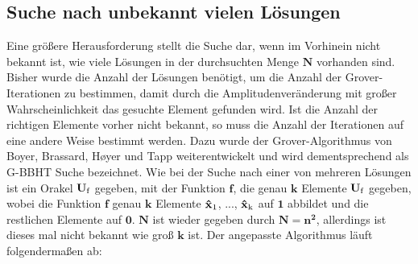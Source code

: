 \subsection{Suche nach unbekannt vielen Lösungen}
Eine größere Herausforderung stellt die Suche dar, wenn im Vorhinein nicht bekannt ist, wie viele Lösungen in der durchsuchten Menge $\mathbf{N}$ vorhanden sind. 
Bisher wurde die Anzahl der Lösungen benötigt, um die Anzahl der Grover-Iterationen zu bestimmen, damit durch die Amplitudenveränderung mit großer Wahrscheinlichkeit das gesuchte Element gefunden wird. 
Ist die Anzahl der richtigen Elemente vorher nicht bekannt, so muss die Anzahl der Iterationen auf eine andere Weise bestimmt werden. 
Dazu wurde der Grover-Algorithmus von Boyer, Brassard, Høyer und Tapp weiterentwickelt und wird dementsprechend als G-BBHT Suche bezeichnet.
Wie bei der Suche nach einer von mehreren Lösungen ist ein Orakel $\mathbf{U \textsubscript{f}}$ gegeben, mit der Funktion $\mathbf{f}$, die genau $\mathbf{k}$ Elemente $\mathbf{U \textsubscript{f}}$ gegeben, wobei die Funktion $\mathbf{f}$ genau $\mathbf{k}$ Elemente $\mathbf{\hat x \textsubscript{1}}$, ..., $\mathbf{\hat x \textsubscript{k}}$ auf $\mathbf{1}$ abbildet und die restlichen Elemente auf $\mathbf{0}$. $\mathbf{N}$ ist wieder gegeben durch $\mathbf{N = n^2}$, allerdings ist dieses mal nicht bekannt wie groß $\mathbf{k}$ ist. Der angepasste Algorithmus läuft folgendermaßen ab:
